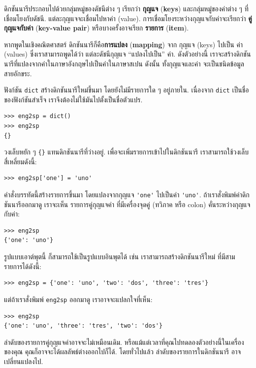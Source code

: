 ดิกชันนารีประกอบไปด้วยกลุ่มหมู่ของดัชนีต่าง ๆ เรียกว่า \textbf{กุญแจ} (\textbf{keys}) และกลุ่มหมู่ของค่าต่าง ๆ ที่เชื่อมโยงกับดัชนี.
แต่ละกุญแจจะเชื่อมไปหาค่า (value).
การเชื่อมโยงระหว่างกุญแจกับค่าจะเรียกว่า \textbf{คู่กุญแจกับค่า} (\textbf{key-value pair}) หรือบางครั้งอาจเรียก \textbf{รายการ} (\textbf{item}).  

หากพูดในเชิงคณิตศาสตร์ ดิกชันนารีก็คือ\textbf{การแปลง} (\textbf{mapping}) จาก กุญแจ (keys) ไปเป็น ค่า (values)
ซึ่งเราสามารถพูดได้ว่า แต่ละดัชนีกุญแจ ``แปลงไปเป็น'' ค่า.
ดังตัวอย่างนี้ เราจะสร้างดิกชันนารีที่แปลงจากคำในภาษาอังกฤษไปเป็นคำในภาษาสเปน
ดังนั้น ทั้งกุญแจและค่า จะเป็นชนิดข้อมูลสายอักขระ.

ฟังก์ชัน \texttt{dict} สร้างดิกชันนารีใหม่ขึ้นมา โดยยังไม่มีรายการใด ๆ อยู่ภายใน.
เนื่องจาก \texttt{dict} เป็นชื่อของฟังก์ชันสำเร็จ
เราจึงต้องไม่ใช้มันไปตั้งเป็นชื่อตัวแปร.

\begin{verbatim}
>>> eng2sp = dict()
>>> eng2sp
{}
\end{verbatim}

วงเล็บหยัก ๆ \verb|{}| แทนดิกชันนารีที่ว่างอยู่.
เพื่อจะเพิ่มรายการเข้าไปในดิกชันนารี เราสามารถใช้วงเล็บสี่เหลี่ยมดังนี้:

\begin{verbatim}
>>> eng2sp['one'] = 'uno'
\end{verbatim}
%
คำสั่งบรรทัดนี้สร้างรายการขึ้นมา
โดยแปลงจากกุญแจ \verb|'one'| ไปเป็นค่า \verb|'uno'|.
ถ้าเราสั่งพิมพ์ค่าดิกชันนารีออกมาดู
เราจะเห็น รายการคู่กุญแจค่า ที่มีเครื่องจุดคู่ (ทวิภาค หรือ colon) คั่นระหว่างกุญแจกับค่า:

\begin{verbatim}
>>> eng2sp
{'one': 'uno'}
\end{verbatim}
%
รูปแบบเอาต์พุตนี้ ก็สามารถใช้เป็นรูปแบบอินพุตได้
เช่น เราสามารถสร้างดิกชันนารีใหม่ ที่มีสามรายการได้ดังนี้:

\begin{verbatim}
>>> eng2sp = {'one': 'uno', 'two': 'dos', 'three': 'tres'}
\end{verbatim}
%
แต่ถ้าเราสั่งพิมพ์ \texttt{eng2sp} ออกมาดู เราอาจจะแปลกใจที่เห็น:

\begin{verbatim}
>>> eng2sp
{'one': 'uno', 'three': 'tres', 'two': 'dos'}
\end{verbatim}
%
ลำดับของรายการคู่กุญแจค่าอาจจะไม่เหมือนเดิม.
หรือแม้แต่เวลาที่คุณไปทดลองตัวอย่างนี้ในเครื่องของคุณ คุณก็อาจจะได้ผลลัพธ์ต่างออกไปก็ได้.
โดยทั่วไปแล้ว ลำดับของรายการในดิกชันนารี อาจเปลี่ยนแปลงไป.

